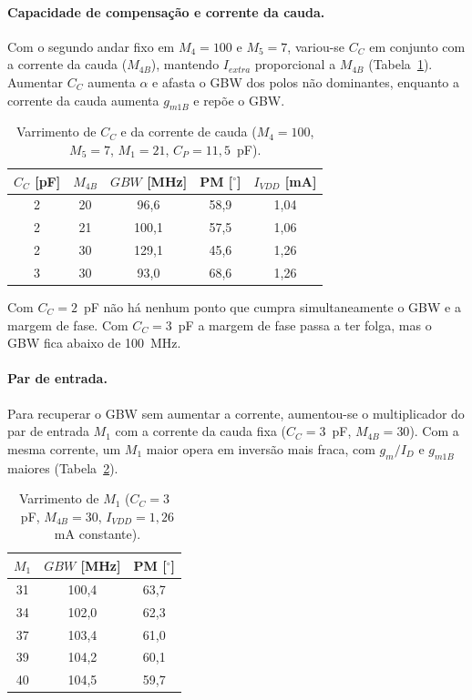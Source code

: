 \paragraph{Capacidade de compensação e corrente da cauda.}
Com o segundo andar fixo em $M_4 = 100$ e $M_5 = 7$, variou-se $C_C$ em conjunto com a corrente da cauda ($M_{4B}$),
mantendo $I_{extra}$ proporcional a $M_{4B}$ (Tabela~\ref{tab:iter_cc}). Aumentar $C_C$ aumenta $\alpha$ e afasta o GBW
dos polos não dominantes, enquanto a corrente da cauda aumenta $g_{m1B}$ e repõe o GBW.

\begin{table}[H]
    \centering
    \caption{Varrimento de $C_C$ e da corrente de cauda ($M_4 = 100$, $M_5 = 7$, $M_1 = 21$, $C_P = 11{,}5$~pF).}
    \label{tab:iter_cc}
    \begin{tabular}{ccccc}
        \toprule
        $C_C$ [pF] & $M_{4B}$ & $GBW$ [MHz] & PM [$^\circ$] & $I_{VDD}$ [mA] \\
        \midrule
        2 & 20 & 96,6  & 58,9 & 1,04 \\
        2 & 21 & 100,1 & 57,5 & 1,06 \\
        2 & 30 & 129,1 & 45,6 & 1,26 \\
        3 & 30 & 93,0  & 68,6 & 1,26 \\
        \bottomrule
    \end{tabular}
\end{table}

Com $C_C = 2$~pF não há nenhum ponto que cumpra simultaneamente o GBW e a margem de fase. Com $C_C = 3$~pF a margem de
fase passa a ter folga, mas o GBW fica abaixo de 100~MHz.

\paragraph{Par de entrada.}
Para recuperar o GBW sem aumentar a corrente, aumentou-se o multiplicador do par de entrada $M_1$ com a corrente da
cauda fixa ($C_C = 3$~pF, $M_{4B} = 30$). Com a mesma corrente, um $M_1$ maior opera em inversão mais fraca, com
$g_m/I_D$ e $g_{m1B}$ maiores (Tabela~\ref{tab:iter_m1}).

\begin{table}[H]
    \centering
    \caption{Varrimento de $M_1$ ($C_C = 3$~pF, $M_{4B} = 30$, $I_{VDD} = 1{,}26$~mA constante).}
    \label{tab:iter_m1}
    \begin{tabular}{ccc}
        \toprule
        $M_1$ & $GBW$ [MHz] & PM [$^\circ$] \\
        \midrule
        31 & 100,4 & 63,7 \\
        34 & 102,0 & 62,3 \\
        37 & 103,4 & 61,0 \\
        39 & 104,2 & 60,1 \\
        40 & 104,5 & 59,7 \\
        \bottomrule
    \end{tabular}
\end{table}

